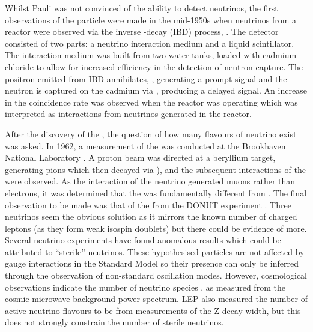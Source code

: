 Whilst Pauli was not convinced of the ability to detect neutrinos, the first observations of the particle were made in the mid-1950s when neutrinos from a reactor were observed via the inverse \quickmath{\beta}-decay (IBD) process,  \cite{reines_cowan_1,reines_cowan_2}.
The detector consisted of two parts: a neutrino interaction medium and a liquid scintillator. The interaction medium was built from two water tanks, loaded with cadmium chloride to allow for increased efficiency in the detection of neutron capture. The positron emitted from IBD annihilates, , generating a prompt signal and the neutron is captured on the cadmium via , producing a delayed signal. An increase in the coincidence rate was observed when the reactor was operating which was interpreted as interactions from neutrinos generated in the reactor.

After the discovery of the , the question of how many flavours of neutrino exist was asked. In 1962, a measurement of the \quickmath{\nu_{\mu}} was conducted at the Brookhaven National Laboratory \cite{PhysRevLett.9.36}. A proton beam was directed at a beryllium target, generating pions which then decayed via \quickmath{\pi^{\pm} \rightarrow \mu^{\pm} + (\nu_{\mu}, \bar{\nu}_\mu}), and the subsequent interactions of the \quickmath{\nu_{\mu}} were observed. As the interaction of the neutrino generated muons rather than electrons, it was determined that the \quickmath{\nu_{\mu}} was fundamentally different from . The final observation to be made was that of the \quickmath{\nu_{\tau}} from the DONUT experiment \cite{tau_nu_disc}. Three neutrinos seem the obvious solution as it mirrors the known number of charged leptons (as they form weak isospin doublets) but there could be evidence of more. Several neutrino experiments have found anomalous results \cite{PhysRevD.64.112007, PhysRevLett.110.161801} which could be attributed to ``sterile'' neutrinos. These hypothesised particles are not affected by gauge interactions in the Standard Model so their presence can only be inferred through the observation of non-standard oscillation modes. However, cosmological observations indicate the number of neutrino species  \cite{Planck2018}, as measured from the cosmic microwave background power spectrum. LEP also measured the number of active neutrino flavours to be  \cite{lep} from measurements of the Z-decay width, but this does not strongly constrain the number of sterile neutrinos.

